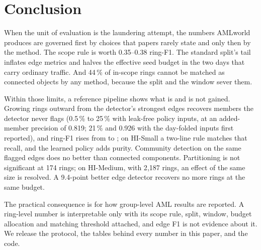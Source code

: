 \section{Conclusion}
\label{sec:conclusion}

When the unit of evaluation is the laundering attempt, the numbers AMLworld produces are
governed first by choices that papers rarely state and only then by the method. The scope rule
is worth 0.35--0.38 ring-F1. The standard split's tail inflates edge metrics and halves the
effective seed budget in the two days that carry ordinary traffic. And 44\,\% of in-scope
rings cannot be matched as connected objects by any method, because the split and the window
sever them.

Within those limits, a reference pipeline shows what is and is not gained. Growing rings
outward from the detector's strongest edges recovers members the detector never flags (0.5\,\%
to 25\,\% with leak-free policy inputs, at an added-member precision of 0.819; 21\,\% and 0.926 with
the day-folded inputs first reported), and ring-F1 rises from  to ; on
HI-Small a two-line rule matches that recall, and the learned policy adds purity. Community
detection on the same flagged edges does no better than connected components. Partitioning is
not significant at 174 rings; on HI-Medium, with 2{,}187 rings, an effect of the same size is
resolved. A 9.4-point better edge detector recovers no more rings at the same budget.

The practical consequence is for how group-level AML results are reported. A ring-level number
is interpretable only with its scope rule, split, window, budget allocation and matching
threshold attached, and edge F1 is not evidence about it. We release the protocol, the tables
behind every number in this paper, and the code.

